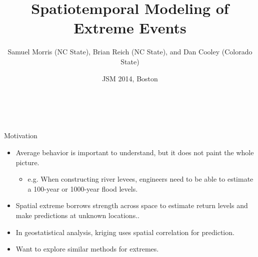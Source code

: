 \documentclass{beamer}
\title[Spatiotemporal Modeling of Extreme Events] %
{
  Spatiotemporal Modeling of Extreme Events
}
\author[S. Morris, B. Reich, and D. Cooley]{Samuel Morris (NC State), Brian Reich (NC State), and Dan Cooley (Colorado State)}
\institute[NCSU, CSU]{}
\date{JSM 2014, Boston}
\begin{document}
\begin{frame}\frametitle{\ }
\begin{center}
	\maketitle
\end{center}
\end{frame}

\begin{frame}{Motivation}
  \begin{itemize} \setlength{\itemsep}{1em}
    \item Average behavior is important to understand, but it does not paint the whole picture.
    \begin{itemize}
      \item e.g. When constructing river levees, engineers need to be able to estimate a 100-year or 1000-year flood levels.
    \end{itemize}
    \item Spatial extreme borrows strength across space to estimate return levels and make predictions at unknown locations..
    \item In geostatistical analysis, kriging uses spatial correlation for prediction.
    \item Want to explore similar methods for extremes.
  \end{itemize}
\end{frame}

\end{document}
